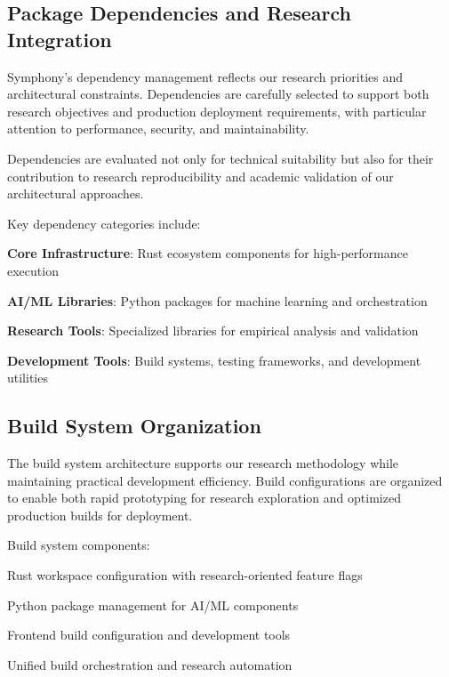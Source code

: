 \subsection*{Package Dependencies and Research Integration}

Symphony's dependency management reflects our research priorities and architectural constraints. Dependencies are carefully selected to support both research objectives and production deployment requirements, with particular attention to performance, security, and maintainability.

\begin{infobox}[title=Research-Driven Dependency Selection]
Dependencies are evaluated not only for technical suitability but also for their contribution to research reproducibility and academic validation of our architectural approaches.
\end{infobox}

Key dependency categories include:
\begin{expandedlist}
    \item \textbf{Core Infrastructure}: Rust ecosystem components for high-performance execution
    \item \textbf{AI/ML Libraries}: Python packages for machine learning and orchestration
    \item \textbf{Research Tools}: Specialized libraries for empirical analysis and validation
    \item \textbf{Development Tools}: Build systems, testing frameworks, and development utilities
\end{expandedlist}

\subsection*{Build System Organization}

The build system architecture supports our research methodology while maintaining practical development efficiency. Build configurations are organized to enable both rapid prototyping for research exploration and optimized production builds for deployment.

Build system components:
\begin{description}[leftmargin=3cm,labelwidth=2.5cm]
    \item[\textbf{Cargo.toml}] Rust workspace configuration with research-oriented feature flags
    \item[\textbf{pyproject.toml}] Python package management for AI/ML components
    \item[\textbf{package.json}] Frontend build configuration and development tools
    \item[\textbf{Makefile}] Unified build orchestration and research automation
\end{description}

